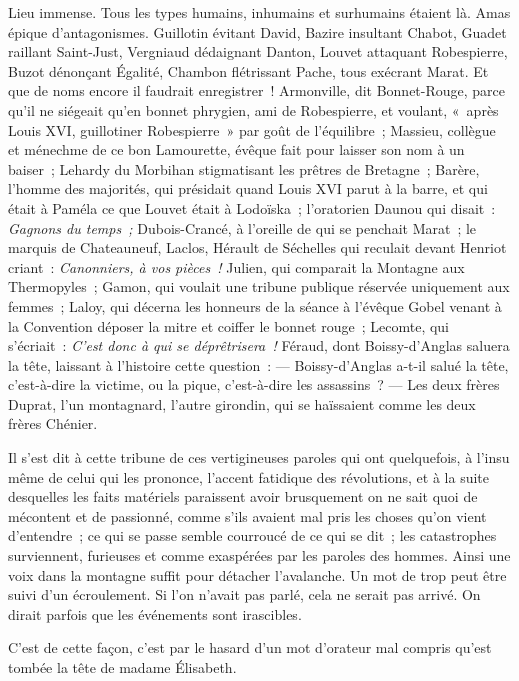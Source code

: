 \documentclass[french,twoside]{book} %
\def\mednobreak{\ifdim\lastskip<\medskipamount
  \removelastskip\nopagebreak\medskip\fi}
\newcommand{\labelblock}[1]{\medbreak{\noindent\color{rubric}\bfseries #1}\par\mednobreak}
\begin{document}
\labelblock{x}

\noindent Lieu immense. Tous les types humains, inhumains et surhumains étaient là. Amas épique d’antagonismes. Guillotin évitant David, Bazire insultant Chabot, Guadet raillant Saint-Just, Vergniaud dédaignant Danton, Louvet attaquant Robespierre, Buzot dénonçant Égalité, Chambon flétrissant Pache, tous exécrant Marat. Et que de noms encore il faudrait enregistrer ! Armonville, dit Bonnet-Rouge, parce qu’il ne siégeait qu’en bonnet phrygien, ami de Robespierre, et voulant, « après Louis XVI, guillotiner Robespierre » par goût de l’équilibre ; Massieu, collègue et ménechme de ce bon Lamourette, évêque fait pour laisser son nom à un baiser ; Lehardy du Morbihan stigmatisant les prêtres de Bretagne ; Barère, l’homme des majorités, qui présidait quand Louis XVI parut à la barre, et qui était à Paméla ce que Louvet était à Lodoïska ; l’oratorien Daunou qui disait : \emph{Gagnons du temps ;} Dubois-Crancé, à l’oreille de qui se penchait Marat ; le marquis de Chateauneuf, Laclos, Hérault de Séchelles qui reculait devant Henriot criant : \emph{Canonniers, à vos pièces !} Julien, qui comparait la Montagne aux Thermopyles ; Gamon, qui voulait une tribune publique réservée uniquement aux femmes ; Laloy, qui décerna les honneurs de la séance à l’évêque Gobel venant à la Convention déposer la mitre et  coiffer le bonnet rouge ; Lecomte, qui s’écriait : \emph{C’est donc à qui se déprêtrisera !} Féraud, dont Boissy-d’Anglas saluera la tête, laissant à l’histoire cette question : — Boissy-d’Anglas a-t-il salué la tête, c’est-à-dire la victime, ou la pique, c’est-à-dire les assassins ? — Les deux frères Duprat, l’un montagnard, l’autre girondin, qui se haïssaient comme les deux frères Chénier.\par
Il s’est dit à cette tribune de ces vertigineuses paroles qui ont quelquefois, à l’insu même de celui qui les prononce, l’accent fatidique des révolutions, et à la suite desquelles les faits matériels paraissent avoir brusquement on ne sait quoi de mécontent et de passionné, comme s’ils avaient mal pris les choses qu’on vient d’entendre ; ce qui se passe semble courroucé de ce qui se dit ; les catastrophes surviennent, furieuses et comme exaspérées par les paroles des hommes. Ainsi une voix dans la montagne suffit pour détacher l’avalanche. Un mot de trop peut être suivi d’un écroulement. Si l’on n’avait pas parlé, cela ne serait pas arrivé. On dirait parfois que les événements sont irascibles.\par
C’est de cette façon, c’est par le hasard d’un mot d’orateur mal compris qu’est tombée la tête de madame Élisabeth.\par
\end{document}
